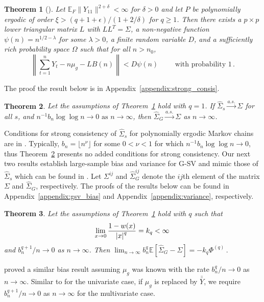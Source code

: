 \documentclass[12pt]{article}
\newcommand{\E}{\mathbb{E}}
\newtheorem{theorem}{Theorem}
\theoremstyle{remark}
\begin{document}
\begin{theorem}[\cite{kuel:1976,vats:fleg:jon:2018}]
  \label{thm:kuelbs}
Let $\E_F\|Y_{11}\|^{2+ \delta} < \infty$ for $\delta > 0$ and let $P$ be polynomially ergodic of order $\xi > (q + 1 + \epsilon)/(1 + 2/\delta)$ for $q \geq 1$. Then there exists a $p \times p$ lower triangular matrix $L$ with $LL^T = \Sigma$, a non-negative function $\psi(n) = n^{1/2 - \lambda}$ for some $\lambda > 0$, a finite random variable $D$, and a sufficiently rich probability space $\Omega$ such that for all $n > n_0$,
\[
\left\|\sum_{t=1}^{n}Y_t - n\mu_g - LB(n)\right\| < D\psi(n) \qquad \text{  with probability 1}\,.
\]
\end{theorem}

The proof the result below is in Appendix~\ref{appendix:strong_consis}.
\begin{theorem}
\label{th:consistency}
 Let the assumptions of Theorem~\ref{thm:kuelbs} hold with $q = 1$. If $\hat{\Sigma}_{s} \xrightarrow{a.s.} \Sigma$ for all $s$, and $n^{-1}{b_n \log \log n} \to 0 \textrm{ as } n \to \infty$, then $\hat{\Sigma}_{G} \overset{a.s.}{\to} \Sigma$ as $n \to \infty$.
\end{theorem} 

Conditions for strong consistency of $\hat{\Sigma}_s$ for polynomially ergodic Markov chains are in \cite{vats:fleg:jon:2018}. Typically, $b_n = \lfloor n^{\nu} \rfloor$ for some $0< \nu <1$ for which $n^{-1} b_n \log \log n \to 0$, thus Theorem~\ref{th:consistency} presents no added conditions for strong consistency. Our next two results establish large-sample bias and variance for G-SV and mimic those of $\hat{\Sigma}_s$ which can be found in \cite{hannan:1970}. Let $\Sigma^{ij}$ and $\hat{\Sigma}_G^{ij}$ denote the $ij$th element of the matrix $\Sigma$ and $\hat{\Sigma}_G$, respectively. The proofs of the results below can be found in Appendix~\ref{appendix:gsv_bias} and Appendix~\ref{appendix:variance}, respectively.

\begin{theorem}\label{th:G-SVE_bias}
Let the assumptions of Theorem~\ref{thm:kuelbs} hold with $q$ such that 
\[
\lim _{x \to 0} \dfrac{1 - w(x)}{\abs{x}^q} = k_q < \infty\,
\] 
and $b_n^{q+1}/n \to 0$ as $n \to \infty$. Then $ \lim_{n \to \infty}b_n^q\mathbb{E} \left[\hat{\Sigma}_{G} - \Sigma \right] = -k_q\Phi^{(q)}\,.$
\end{theorem}
\cite{hannan:1970} proved a similar bias result assuming $\mu_g$ was known with the rate $b_n^q/n \to 0$ as $n \to \infty$. Similar to \cite{ande:1971} for the univariate case, if $\mu_g$ is replaced by $\bar{\bar{Y}}$, we require $b_n^{q+1}/n \to 0$ as $n\to \infty$ for the multivariate case.
\end{document}

